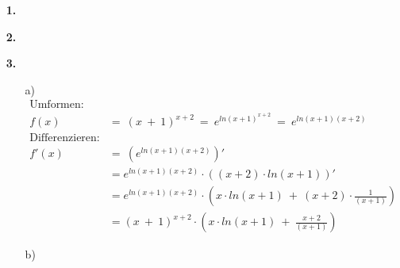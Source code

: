 \documentclass[a4paper,11pt]{article}
\title{\titleinfo}
\author{\authorinfotitle}
\date{\today}
\begin{document}
\maketitle
    \begin{enumerate}
        \item[\textbf{1.}]
            \todo
              
        \item[\textbf{2.}]
        	\todo
        \item[\textbf{3.}]
            \begin{enumerate}
            \item[{a)}]
                    \begin{align*}
                    \text{Umformen:}& \\
                    f(x) \ &= \ (x\ +\ 1)^{x+2} \ = \ e^{ln(x+1)^{x+2}} \ = \  e^{ln(x+1)(x+2)} \\
                    \text{Differenzieren:}& \\
                    f'(x) \ &= \  \left(e^{ln(x+1)(x+2)} \right)'  \\
                    &=  e^{ln(x+1)(x+2)} \cdot \left((x+2) \cdot ln(x+1)\right)'  \\
                    &= e^{ln(x+1)(x+2)} \cdot \left(x \cdot ln(x+1) \ +\ (x+2)\cdot \frac{1}{(x+1)}\right) \\
                    &= (x\ +\ 1)^{x+2} \cdot \left(x \cdot ln(x+1) \ +\ \frac{x+2}{(x+1)}\right) 
                    \end{align*}
             \item[{b)}]
                    \begin{enumerate}


\end{enumerate}
\end{enumerate}
\end{enumerate}
\end{document}
